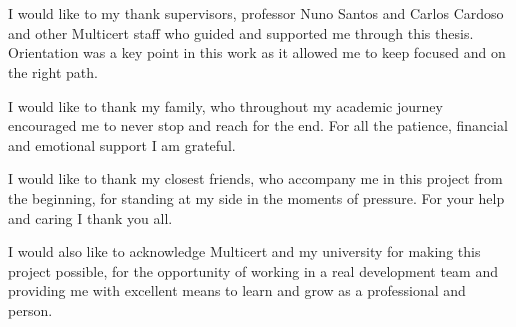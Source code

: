 
\section*{\acknowledgments}

I would like to my thank supervisors, professor Nuno Santos and Carlos Cardoso and other Multicert staff who guided and supported me through this thesis. Orientation was a key point in this work as it allowed me to keep focused and on the right path. 

I would like to thank my family, who throughout my academic journey encouraged me to never stop and reach for the end. For all the patience, financial and emotional support I am grateful.

I would like to thank my closest friends, who accompany me in this project from the beginning, for standing at my side in the moments of pressure. For your help and caring I thank you all.

I would also like to acknowledge Multicert and my university for making this project possible, for the opportunity of working in a real development team and providing me with excellent means to learn and grow as a professional and person.
